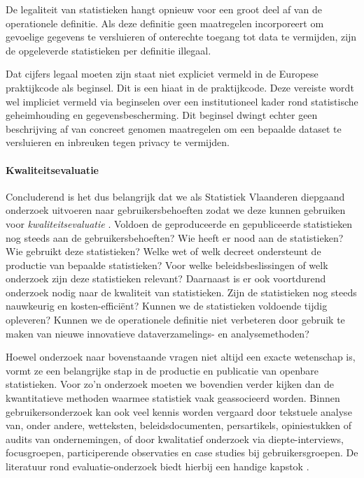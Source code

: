 \documentclass[\mainfiledir/00_handleiding_statistiekproductie.tex]{subfiles}
\begin{document}
De legaliteit van statistieken hangt opnieuw voor een groot deel af van de operationele definitie. Als deze definitie geen maatregelen incorporeert om gevoelige gegevens te versluieren of onterechte toegang tot data te vermijden, zijn de opgeleverde statistieken per definitie illegaal.

\begin{info}
	Dat cijfers legaal moeten zijn staat niet expliciet vermeld in de Europese praktijkcode als beginsel. Dit is een hiaat in de praktijkcode. Deze vereiste wordt wel impliciet vermeld via beginselen over een institutioneel kader rond statistische geheimhouding en gegevensbescherming. Dit beginsel dwingt echter geen beschrijving af van concreet genomen maatregelen om een bepaalde dataset te versluieren en inbreuken tegen privacy te vermijden. 
\end{info}




\paragraph{Kwaliteitsevaluatie}

Concluderend is het dus belangrijk dat we als Statistiek Vlaanderen diepgaand onderzoek uitvoeren naar gebruikersbehoeften zodat we deze kunnen gebruiken voor \emph{kwaliteitsevaluatie} \parencite{UNSD2025Handbook}. Voldoen de geproduceerde en gepubliceerde statistieken nog steeds aan de gebruikersbehoeften? Wie heeft er nood aan de statistieken? Wie gebruikt deze statistieken? Welke wet of welk decreet ondersteunt de productie van bepaalde statistieken? Voor welke beleidsbeslissingen of welk onderzoek zijn deze statistieken relevant? Daarnaast is er ook voortdurend onderzoek nodig naar de kwaliteit van statistieken. Zijn de statistieken nog steeds nauwkeurig en kosten-efficiënt? Kunnen we de statistieken voldoende tijdig opleveren? Kunnen we de operationele definitie niet verbeteren door gebruik te maken van nieuwe innovatieve dataverzamelings- en analysemethoden?

Hoewel onderzoek naar bovenstaande vragen niet altijd een exacte wetenschap is, vormt ze een belangrijke stap in de productie en publicatie van openbare statistieken. Voor zo’n onderzoek moeten we bovendien verder kijken dan de kwantitatieve methoden waarmee statistiek vaak geassocieerd worden. Binnen gebruikersonderzoek kan ook veel kennis worden vergaard door tekstuele analyse van, onder andere, wetteksten, beleidsdocumenten, persartikels, opiniestukken of audits van ondernemingen, of door kwalitatief onderzoek via diepte-interviews, focusgroepen, participerende observaties en case studies bij gebruikersgroepen. De literatuur rond evaluatie-onderzoek biedt hierbij een handige kapstok \parencite[zie bijvoorbeeld][]{Rossi2018Evaluation, MertensWilsonHall2025}. 
\end{document}
